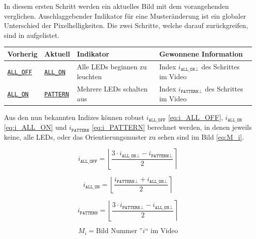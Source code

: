
In diesem ersten Schritt werden ein aktuelles Bild mit dem vorangehenden verglichen.
Auschlaggebender Indikator für eine Musteränderung ist ein globaler Unterschied der Pixelhelligkeiten.
Die zwei Schritte, welche darauf zurückgreifen, sind in  aufgelistet.

\tablevspaceAStable
\begin{tabular}{ @{} >{\RaggedRight\hspace{0pt}} llll @{} }
  Vorherig & Aktuell & Indikator & Gewonnene Information\\
  \hline
  \hyperlink{order:step1}{\texttt{ALL\_OFF}} & \hyperlink{order:step2}{\texttt{ALL\_ON}} & Alle LEDs beginnen zu leuchten & Index $i_{\texttt{ALL\_ON}\bot}$ des Schrittes im Video \\
  \hyperlink{order:step2}{\texttt{ALL\_ON}} & \hyperlink{order:step3}{\texttt{PATTERN}} & Mehrere LEDs schalten aus & Index $i_{\texttt{PATTERN}\bot}$ des Schrittes im Video \\
\end{tabular}
\label{table:Initiale-Detektion}
\tablevspaceAStable

Aus den nun bekannten Indizes können robust
$i_\texttt{ALL\_OFF}$ \eqref{eq:i_ALL_OFF},
$i_\texttt{ALL\_ON}$ \eqref{eq:i_ALL_ON} und
$i_\texttt{PATTERN}$ \eqref{eq:i_PATTERN}
berechnet werden, in denen jeweils keine, alle LEDs, oder das Orientierungsmuster zu sehen sind im Bild \eqref{eq:M_i}.

\begin{equation}\label{eq:i_ALL_OFF}
  i_\texttt{ALL\_OFF} = \left\lfloor \frac{3\cdot i_{\texttt{ALL\_ON}\bot} - i_{\texttt{PATTERN}\bot}}{2} \right\rceil
\end{equation}

\begin{equation}\label{eq:i_ALL_ON}
  i_\texttt{ALL\_ON} = \left\lfloor \frac{i_{\texttt{PATTERN}\bot} + i_{\texttt{ALL\_ON}\bot}}{2} \right\rceil
\end{equation}

\begin{equation}\label{eq:i_PATTERN}
  i_\texttt{PATTERN} = \left\lfloor \frac{3\cdot i_{\texttt{PATTERN}\bot} - i_{\texttt{ALL\_ON}\bot}}{2} \right\rceil
\end{equation}

\begin{equation}\label{eq:M_i}
    M_i = \text{Bild Nummer ''} i \text{`` im Video}
\end{equation}

